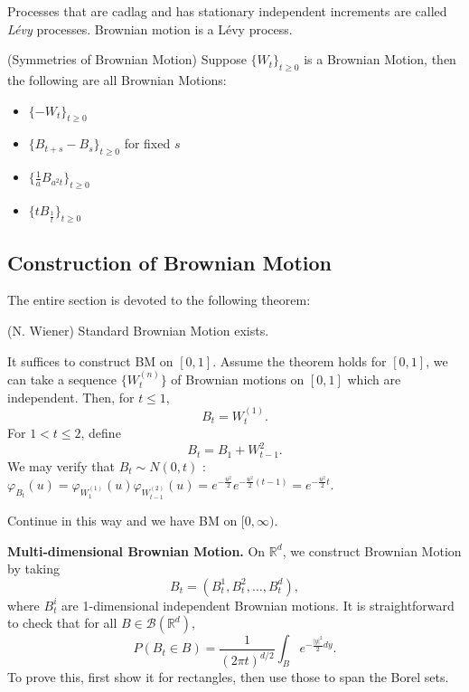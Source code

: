 \begin{remark}
	Processes that are cadlag and has stationary independent increments are called \textit{L\'evy} processes. Brownian motion is a L\'evy process.
\end{remark}

\begin{proposition}(Symmetries of Brownian Motion)
	Suppose $\{W_t\} _{t \ge 0}$ is a Brownian Motion, then the following are all Brownian Motions:
	\begin{itemize}
		\item $\{- W_t\} _{t \ge 0}$
		\item $\{B_{t + s} - B_s\} _{t \ge 0}$ for fixed $s$
		\item  $\{\frac{1}{a} B_{a^2 t}\} _{t \ge 0}$ 
		\item $\{t B _{\frac{1}{t}}\} _{t \ge 0}$ 
	\end{itemize}
\end{proposition}


\subsection{Construction of Brownian Motion}

The entire section is devoted to the following theorem:

\begin{theorem}(N. Wiener) 
	Standard Brownian Motion exists.
\end{theorem}

It suffices to construct BM on $[0,1]$. Assume the theorem holds for $[0,1]$, we can take a sequence $\{W_t^{(n)}\}$ of Brownian motions on $[0,1]$ which are independent. Then, for $t \le 1$,
 \[
	B_t = W_t^{(1)}
.\] 
For $1 < t \le 2$, define
\[
	B_t = B_1 + W_{t - 1}^{2}
.\] 
We may verify that $B_t \sim N(0,t)$ : $\varphi_{B_t}(u) = \varphi_{W_1^{(1)}}(u) \varphi_{W_{t - 1}^{(2)}}(u) = e^{- \frac{u^2}{2}} e^{- \frac{u^2}{2}(t - 1)} = e^{- \frac{u^2}{2}t}$.

Continue in this way and we have BM on $[0,\infty )$.

\textbf{Multi-dimensional Brownian Motion.}
On $\mathbb{R}^d$, we construct Brownian Motion by taking
\[
	B_t = \left( B_t^1, B_t^2, \ldots, B_t^d \right) 
,\] 
where $B_t^i$ are 1-dimensional independent Brownian motions. It is straightforward to check that for all $B \in \mathcal{B}(\mathbb{R}^d)$,
\[
	P(B_t \in B) = 
	\frac{1}{\left( 2 \pi t \right) ^{d / 2}}
	\int _B e^{- \frac{|y|^2}{2}d y}
.\] 
To prove this, first show it for rectangles, then use those to span the Borel sets.


